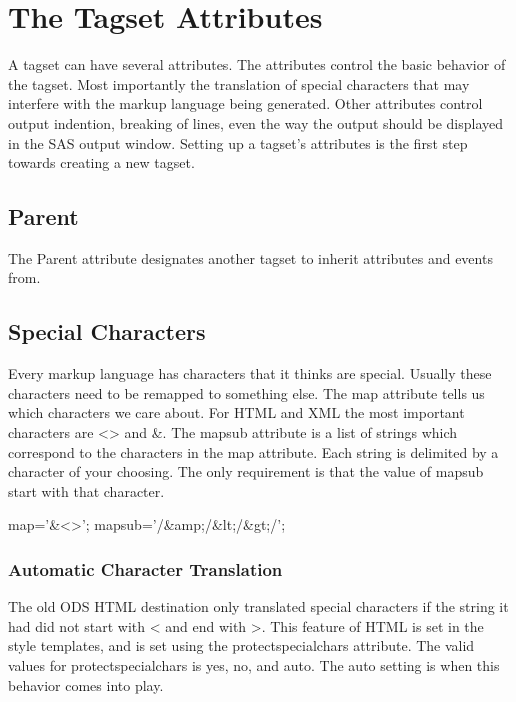 \chapter{The Tagset Attributes}
A tagset can have several attributes.  The attributes control the basic
behavior of the tagset.  Most importantly the translation of special
characters that may interfere with the markup language being generated.
Other attributes control output indention, breaking of lines, even the
way the output should be displayed in the SAS output window.  Setting 
up a tagset's attributes is the first step towards creating a new tagset.

\section{Parent}
The Parent attribute designates another tagset to inherit attributes and events
from.

\section{Special Characters}
Every markup language has characters that it thinks are special.  Usually
these characters need to be remapped to something else.  
The map attribute tells us which characters we care about.
For HTML and XML the most important characters are <> and \&.   
The mapsub attribute is a list of strings which correspond to the characters
in the map attribute.  Each string is delimited by a character of
your choosing.  The only requirement is that the value of mapsub
start with that character.

\begin{sfvcode}
   map='\&<>';
   mapsub='/\&amp;/\&lt;/\&gt;/';
\end{sfvcode}

\subsection{Automatic Character Translation}
The old ODS HTML destination only translated special characters if the string
it had did not start with < and end with >.   This feature of HTML is set
in the style templates, and is set using the protectspecialchars attribute.
The valid values for protectspecialchars is yes, no, and auto.  The auto 
setting is when this behavior comes into play.

